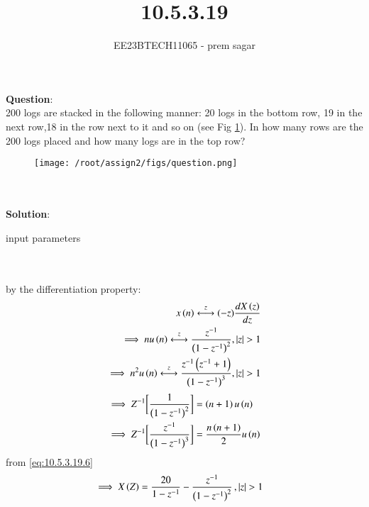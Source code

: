 \documentclass[journal,12pt,twocolumn]{IEEEtran}
\theoremstyle{remark}
\begin{document}

\vspace{3cm}

\title{10.5.3.19}
\author{EE23BTECH11065 - prem sagar}
\maketitle
\newpage

\bigskip 

\renewcommand{\thefigure}{\arabic{figure}}
\renewcommand{\thetable}{\arabic{table}}
\textbf{Question}:\\  200 logs are stacked in the following manner: 20 logs in the bottom row, 19 in the next row,18 in the row next to it and so on (see Fig \ref{fig:10.5.3.19.q}). In how many rows are the 200 logs placed and how many logs are in the top row?
\begin{figure}[h]
    \centering
    \texttt{[image: /root/assign2/figs/question.png]}
    \caption{ }
    \label{fig:10.5.3.19.q}
\end{figure}
\\\\\textbf{Solution}:
\begin{table}[!ht]
  \def\arraystretch{1.5}
  \centering
  \renewcommand\thetable{1}
  
  \caption{input parameters}
  \label{tab:10.5.3.19}
  \end{table}
\\\\by the differentiation property:
\\\begin{align}
 x\left(n\right)\overset{z}{\longleftrightarrow} (-z)\frac{dX\left(z\right)}{dz}
 \\\implies n u\left(n\right)\overset{z}{\longleftrightarrow} \frac{z^{-1}}{\left(1-z^{-1}\right)^2},\left\vert z\right\vert>1
 \\\implies n^2 u\left(n\right)\overset{z}{\longleftrightarrow} \frac{z^{-1}\left(z^{-1}+1\right)}{\left(1-z^{-1}\right)^3} ,\left\vert z\right\vert>1
 \label{eq:10.5.3.19.6}
 \end{align}
 \begin{align}
 \implies Z^{-1}\biggl[\frac{1}{\left(1-z^{-1}\right)^2}\biggr]&=\left(n+1\right)u\left(n\right)
\\\implies Z^{-1}\biggl[\frac{z^{-1}}{\left(1-z^{-1}\right)^3}\biggr]&=\frac{n\left(n+1\right)}{2}u\left(n\right)
\label{eq:10.5.3.19.8}
 \end{align}
 from \eqref{eq:10.5.3.19.6}
\begin{align} 
\implies X\left(Z\right)&=\frac{20}{1-z^{-1}}-\frac{z^{-1}}{\left(1-z^{-1}\right)^2}\,,\left\vert z\right\vert>1
\label{eq:10.5.3.19.9}
\end{align}
\end{document}

